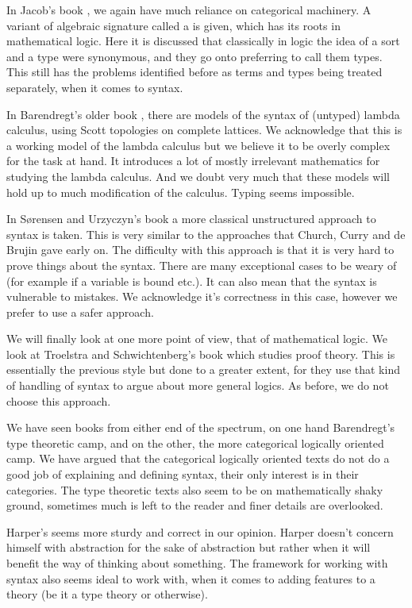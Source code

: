 In Jacob's book \cite{JacobsCLTT}, we again have much reliance on categorical machinery. A variant of algebraic signature called a  is given, which has its roots in mathematical logic. Here it is discussed that classically in logic the idea of a sort and a type were synonymous, and they go onto preferring to call them types. This still has the problems identified before as terms and types being treated separately, when it comes to syntax.

In Barendregt's older book \cite{barendregt1984lambda}, there are models of the syntax of (untyped) lambda calculus, using Scott topologies on complete lattices. We acknowledge that this is a working model of the lambda calculus but we believe it to be overly complex for the task at hand. It introduces a lot of mostly irrelevant mathematics for studying the lambda calculus. And we doubt very much that these models will hold up to much modification of the calculus. Typing seems impossible.

In S{\o}rensen and Urzyczyn's book \cite{Sorensen:2006:LCI:1197021} a more classical unstructured approach to syntax is taken. This is very similar to the approaches that Church, Curry and de Brujin gave early on. The difficulty with this approach is that it is very hard to prove things about the syntax. There are many exceptional cases to be weary of (for example if a variable is bound etc.). It can also mean that the syntax is vulnerable to mistakes. We acknowledge it's correctness in this case, however we prefer to use a safer approach.

We will finally look at one more point of view, that of mathematical logic. We look at Troelstra and Schwichtenberg's book \cite{troelstra_schwichtenberg_2000} which studies proof theory. This is essentially the previous style but done to a greater extent, for they use that kind of handling of syntax to argue about more general logics. As before, we do not choose this approach.

We have seen books from either end of the spectrum, on one hand Barendregt's type theoretic camp, and on the other, the more categorical logically oriented camp. We have argued that the categorical logically oriented texts do not do a good job of explaining and defining syntax, their only interest is in their categories. The type theoretic texts also seem to be on mathematically shaky ground, sometimes much is left to the reader and finer details are overlooked.

Harper's seems more sturdy and correct in our opinion. Harper doesn't concern himself with abstraction for the sake of abstraction but rather when it will benefit the way of thinking about something. The framework for working with syntax also seems ideal to work with, when it comes to adding features to a theory (be it a type theory or otherwise).

